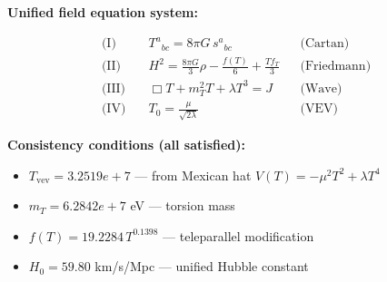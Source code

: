 
\textbf{Unified field equation system:}

\begin{align}
  \text{(I)} \quad & T^a{}_{bc} = 8\pi G \, s^a{}_{bc} && \text{(Cartan)} \\
  \text{(II)} \quad & H^2 = \frac{8\pi G}{3}\rho - \frac{f(T)}{6} + \frac{Tf_T}{3} && \text{(Friedmann)} \\
  \text{(III)} \quad & \Box T + m_T^2 T + \lambda T^3 = J && \text{(Wave)} \\
  \text{(IV)} \quad & T_0 = \frac{\mu}{\sqrt{2\lambda}} && \text{(VEV)}
\end{align}

\textbf{Consistency conditions (all satisfied):}
\begin{itemize}
  \item $T_{\text{vev}} = 3.2519e+7$ — from Mexican hat $V(T) = -\mu^2 T^2 + \lambda T^4$
  \item $m_T = 6.2842e+7$ eV — torsion mass
  \item $f(T) = 19.2284 \, T^{0.1398}$ — teleparallel modification
  \item $H_0 = 59.80$ km/s/Mpc — unified Hubble constant
\end{itemize}